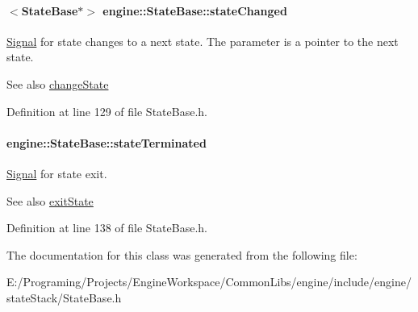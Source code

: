 \paragraph[{\texorpdfstring{state\+Changed}{stateChanged}}]{$<${\bf State\+Base}$\ast$$>$ engine\+::\+State\+Base\+::state\+Changed\hspace{0.3cm}{\ttfamily [protected]}}\hypertarget{a00072_aa585934f221ce16ddac54f79c759e30e}{}\label{a00072_aa585934f221ce16ddac54f79c759e30e}
\hyperlink{a00065}{Signal} for state changes to a next state. The parameter is a pointer to the next state. \begin{DoxySeeAlso}{See also}
\hyperlink{a00072_a95a7fffdec13deafa7855755f6f5f153}{change\+State} 
\end{DoxySeeAlso}


Definition at line 129 of file State\+Base.\+h.

\paragraph[{\texorpdfstring{state\+Terminated}{stateTerminated}}]{ engine\+::\+State\+Base\+::state\+Terminated\hspace{0.3cm}{\ttfamily [protected]}}\hypertarget{a00072_aa833cf334d703956398b0eab5353fb14}{}\label{a00072_aa833cf334d703956398b0eab5353fb14}
\hyperlink{a00065}{Signal} for state exit. \begin{DoxySeeAlso}{See also}
\hyperlink{a00072_a04227376a170bdb851e0e03a4949f564}{exit\+State} 
\end{DoxySeeAlso}


Definition at line 138 of file State\+Base.\+h.



The documentation for this class was generated from the following file\+:\begin{DoxyCompactItemize}
\item 
E\+:/\+Programing/\+Projects/\+Engine\+Workspace/\+Common\+Libs/engine/include/engine/state\+Stack/State\+Base.\+h\end{DoxyCompactItemize}
